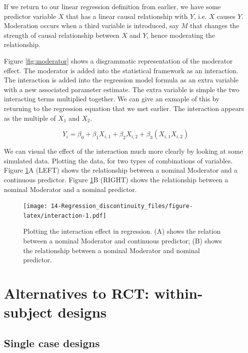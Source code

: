 \documentclass[]{book}
\begin{document}
If we return to our linear regression definition from earlier, we have some predictor variable \(X\) that has a linear causal relationship with \(Y\), i.e. \(X\) causes \(Y\). Moderation occurs when a third variable is introduced, say \(M\) that changes the strength of causal relationship between \(X\) and \(Y\), hence moderating the relationship.

Figure \ref{fig:moderator} shows a disgrammatic representation of the moderator effect. The moderator is added into the statistical framework as an interaction. The interaction is added into the regression model formula as an extra variable with a new associated parameter estimate. The extra variable is simple the two interacting terms multiplied together. We can give an exmaple of this by returning to the regression equation that we met earlier. The interaction appears as the multiple of \(X_{1}\) and \(X_{2}\).

\[Y_{i} = \beta_{0} +  \beta_{1}X_{i,1} + \beta_{2}X_{i,2} + \beta_{3}(X_{i,1}X_{i,2})\]

We can visual the effect of the interaction much more clearly by looking at some simulated data. Plotting the data, for two types of combinations of variables. Figure \ref{fig:interaction}A (LEFT) shows the relationship between a nominal Moderator and a continuous predictor. Figure \ref{fig:interaction}B (RIGHT) shows the relationship between a nominal Moderator and a nominal predictor.

\begin{figure}
\centering
\texttt{[image: 14-Regression\_discontinuity\_files/figure-latex/interaction-1.pdf]}
\caption{\label{fig:interaction}Plotting the interaction effect in regression. (A) shows the relation between a nominal Moderator and continuous predictor; (B) shows the relationship between a nominal Moderator and nominal predictor.}
\end{figure}

\hypertarget{alternatives-to-rct-within-subject-designs}{%
\chapter{Alternatives to RCT: within-subject designs}\label{alternatives-to-rct-within-subject-designs}}

\hypertarget{single-case-designs}{%
\section{Single case designs}\label{single-case-designs}}
\end{document}
